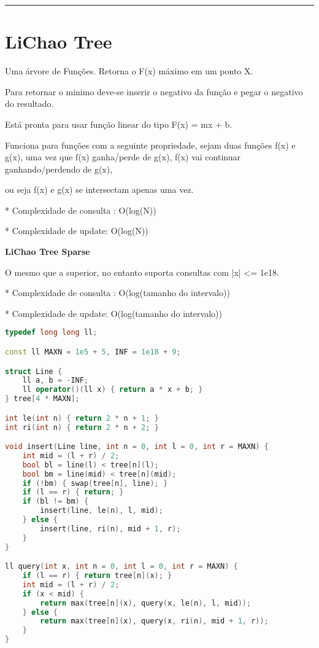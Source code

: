 \documentclass[11pt, a4paper, twoside]{book}
\begin{document}
\hfill

\rule{\textwidth}{0.4pt}

\section{LiChao Tree}



Uma árvore de Funções. Retorna o F(x) máximo em um ponto X.



Para retornar o minimo deve-se inserir o negativo da função e pegar o negativo do resultado.



Está pronta para usar função linear do tipo F(x) = mx + b.



Funciona para funções com a seguinte propriedade, sejam duas funções f(x) e g(x), uma vez que f(x) ganha/perde de g(x), f(x) vai continuar ganhando/perdendo de g(x),

ou seja f(x) e g(x) se intersectam apenas uma vez.



* Complexidade de consulta : O(log(N))

* Complexidade de update: O(log(N))



\textbf{LiChao Tree Sparse} 



O mesmo que a superior, no entanto suporta consultas com |x| <= 1e18.



* Complexidade de consulta : O(log(tamanho do intervalo))

* Complexidade de update: O(log(tamanho do intervalo))


\hfill

\begin{lstlisting}[language=C++]
typedef long long ll;

const ll MAXN = 1e5 + 5, INF = 1e18 + 9;

struct Line {
    ll a, b = -INF;
    ll operator()(ll x) { return a * x + b; }
} tree[4 * MAXN];

int le(int n) { return 2 * n + 1; }
int ri(int n) { return 2 * n + 2; }

void insert(Line line, int n = 0, int l = 0, int r = MAXN) {
    int mid = (l + r) / 2;
    bool bl = line(l) < tree[n](l);
    bool bm = line(mid) < tree[n](mid);
    if (!bm) { swap(tree[n], line); }
    if (l == r) { return; }
    if (bl != bm) {
        insert(line, le(n), l, mid);
    } else {
        insert(line, ri(n), mid + 1, r);
    }
}

ll query(int x, int n = 0, int l = 0, int r = MAXN) {
    if (l == r) { return tree[n](x); }
    int mid = (l + r) / 2;
    if (x < mid) {
        return max(tree[n](x), query(x, le(n), l, mid));
    } else {
        return max(tree[n](x), query(x, ri(n), mid + 1, r));
    }
}
\end{lstlisting}
\end{document}
